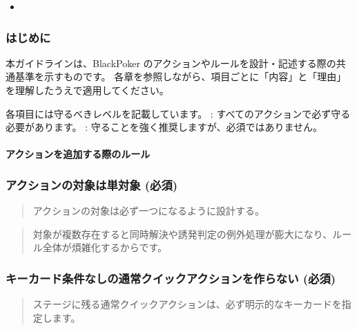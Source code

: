 \documentclass[letterpaper,10pt,dvipdfmx]{sphinxmanual}
\begin{document}
\begin{sphinxShadowBox}
\begin{itemize}
\begin{itemize}
\end{itemize}

\item {} 
\sphinxAtStartPar
{}\label{\detokenize{appendix/guideline/customRule:id19}}{\hyperref[\detokenize{appendix/guideline/customRule:id10}]{}}

\end{itemize}
\end{sphinxShadowBox}


\subsubsection{はじめに}
\label{\detokenize{appendix/guideline/customRule:id2}}
\sphinxAtStartPar
本ガイドラインは、BlackPoker のアクションやルールを設計・記述する際の共通基準を示すものです。
各章を参照しながら、項目ごとに「内容」と「理由」を理解したうえで適用してください。

\sphinxAtStartPar
各項目には守るべきレベルを記載しています。
\sphinxhyphen{} : すべてのアクションで必ず守る必要があります。
\sphinxhyphen{} : 守ることを強く推奨しますが、必須ではありません。


\paragraph{アクションを追加する際のルール}
\label{\detokenize{appendix/guideline/customRule:id3}}

\subsubsection{アクションの対象は単対象 (必須)}
\label{\detokenize{appendix/guideline/customRule:id4}}
\sphinxAtStartPar
{}
\begin{quote}

\sphinxAtStartPar
アクションの対象は必ず一つになるように設計する。
\end{quote}

\sphinxAtStartPar
{}
\begin{quote}

\sphinxAtStartPar
対象が複数存在すると同時解決や誘発判定の例外処理が膨大になり、ルール全体が煩雑化するからです。
\end{quote}


\subsubsection{キーカード条件なしの通常\sphinxhyphen{}クイックアクションを作らない (必須)}
\label{\detokenize{appendix/guideline/customRule:id5}}
\sphinxAtStartPar
{}
\begin{quote}

\sphinxAtStartPar
ステージに残る通常\sphinxhyphen{}クイックアクションは、必ず明示的なキーカードを指定します。
\end{quote}
\end{document}
